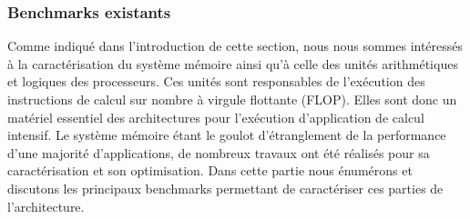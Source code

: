      
    \subsubsection{Benchmarks existants}

        Comme indiqué dans l'introduction de cette section, nous nous sommes intéressés à la caractérisation du système mémoire ainsi qu'à celle des unités arithmétiques et logiques des processeurs. Ces unités sont responsables de l'exécution des instructions de calcul sur nombre à virgule flottante (FLOP). Elles sont donc un matériel essentiel des architectures pour l'exécution d'application de calcul intensif. Le système mémoire étant le goulot d'étranglement de la performance d'une majorité d'applications, de nombreux travaux ont été réalisés pour sa caractérisation et son optimisation. Dans cette partie nous énumérons et discutons les principaux benchmarks permettant de caractériser ces parties de l'architecture.


 
        

